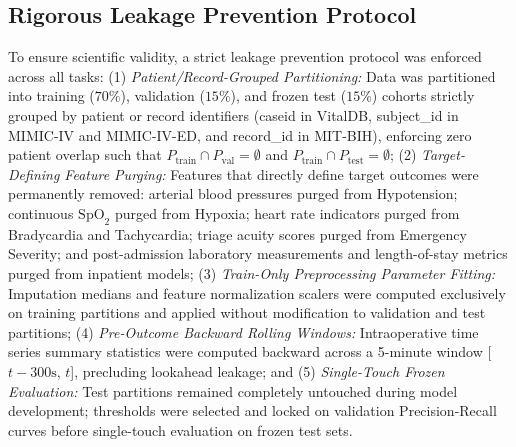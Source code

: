 \documentclass[conference]{IEEEtran}
\begin{document}
\subsection{Rigorous Leakage Prevention Protocol}
To ensure scientific validity, a strict leakage prevention protocol was enforced across all tasks: (1) \textit{Patient/Record-Grouped Partitioning:} Data was partitioned into training ($70\%$), validation ($15\%$), and frozen test ($15\%$) cohorts strictly grouped by patient or record identifiers (caseid in VitalDB, subject\_id in MIMIC-IV and MIMIC-IV-ED, and record\_id in MIT-BIH), enforcing zero patient overlap such that $P_{\text{train}} \cap P_{\text{val}} = \emptyset$ and $P_{\text{train}} \cap P_{\text{test}} = \emptyset$; (2) \textit{Target-Defining Feature Purging:} Features that directly define target outcomes were permanently removed: arterial blood pressures purged from Hypotension; continuous $\text{SpO}_2$ purged from Hypoxia; heart rate indicators purged from Bradycardia and Tachycardia; triage acuity scores purged from Emergency Severity; and post-admission laboratory measurements and length-of-stay metrics purged from inpatient models; (3) \textit{Train-Only Preprocessing Parameter Fitting:} Imputation medians and feature normalization scalers were computed exclusively on training partitions and applied without modification to validation and test partitions; (4) \textit{Pre-Outcome Backward Rolling Windows:} Intraoperative time series summary statistics were computed backward across a 5-minute window [$t - 300\text{s}$, $t$], precluding lookahead leakage; and (5) \textit{Single-Touch Frozen Evaluation:} Test partitions remained completely untouched during model development; thresholds were selected and locked on validation Precision-Recall curves before single-touch evaluation on frozen test sets.
\end{document}
